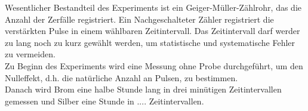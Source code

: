 Wesentlicher Bestandteil des Experiments ist ein Geiger-Müller-Zählrohr, das die Anzahl der Zerfälle registriert. Ein Nachgeschalteter Zähler registriert die verstärkten Pulse in einem wählbaren Zeitintervall. Das Zeitintervall darf werder zu lang noch zu kurz gewählt werden, um statistische und systematische Fehler zu vermeiden. \\
Zu Beginn des Experiments wird eine Messung ohne Probe durchgeführt, um den Nulleffekt, d.h. die natürliche Anzahl an Pulsen, zu bestimmen. \\
Danach wird Brom eine halbe Stunde lang in drei minütigen Zeitintervallen gemessen und Silber eine Stunde in .... Zeitintervallen.

